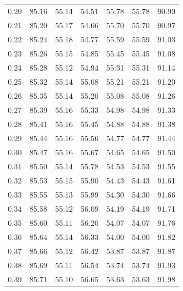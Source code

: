 \begin{tabular}{|c|c|c|c|c|c|c|}
      0.20 &     85.16 &     55.14 &      54.51 &   55.78 &      55.78 &         90.90 \\
      0.21 &     85.20 &     55.17 &      54.66 &   55.70 &      55.70 &         90.97 \\
      0.22 &     85.24 &     55.18 &      54.77 &   55.59 &      55.59 &         91.03 \\
      0.23 &     85.26 &     55.15 &      54.85 &   55.45 &      55.45 &         91.08 \\
      0.24 &     85.28 &     55.12 &      54.94 &   55.31 &      55.31 &         91.14 \\
      0.25 &     85.32 &     55.14 &      55.08 &   55.21 &      55.21 &         91.20 \\
      0.26 &     85.35 &     55.14 &      55.20 &   55.08 &      55.08 &         91.26 \\
      0.27 &     85.39 &     55.16 &      55.33 &   54.98 &      54.98 &         91.33 \\
      0.28 &     85.41 &     55.16 &      55.45 &   54.88 &      54.88 &         91.38 \\
      0.29 &     85.44 &     55.16 &      55.56 &   54.77 &      54.77 &         91.44 \\
      0.30 &     85.47 &     55.16 &      55.67 &   54.65 &      54.65 &         91.50 \\
      0.31 &     85.50 &     55.14 &      55.78 &   54.53 &      54.53 &         91.55 \\
      0.32 &     85.53 &     55.15 &      55.90 &   54.43 &      54.43 &         91.61 \\
      0.33 &     85.55 &     55.13 &      55.99 &   54.30 &      54.30 &         91.66 \\
      0.34 &     85.58 &     55.12 &      56.09 &   54.19 &      54.19 &         91.71 \\
      0.35 &     85.60 &     55.11 &      56.20 &   54.07 &      54.07 &         91.76 \\
      0.36 &     85.64 &     55.14 &      56.33 &   54.00 &      54.00 &         91.82 \\
      0.37 &     85.66 &     55.12 &      56.42 &   53.87 &      53.87 &         91.87 \\
      0.38 &     85.69 &     55.11 &      56.54 &   53.74 &      53.74 &         91.93 \\
      0.39 &     85.71 &     55.10 &      56.65 &   53.63 &      53.63 &         91.98 \\

\end{tabular}
